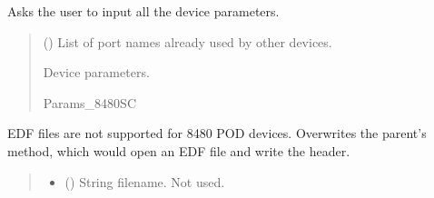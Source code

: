 \documentclass[letterpaper,10pt,english]{sphinxmanual}
\begin{document}
\begin{fulllineitems}
\begin{fulllineitems}
\label{\detokenize{Setup.SetupOneDevice:Setup.SetupOneDevice.Setup_8480SC.Setup8480SC._GetParam_onePODdevice}}
\pysigstartsignatures
{}
\pysigstopsignatures
\sphinxAtStartPar
Asks the user to input all the device parameters.
\begin{quote}\begin{description}
\sphinxAtStartPar
{} (\sphinxstyleliteralemphasis{\sphinxupquote{{[}}}\sphinxstyleliteralemphasis{\sphinxupquote{{]}}}) \textendash{} List of port names already used by other devices.

\sphinxAtStartPar
Device parameters.

\sphinxAtStartPar
Params\_8480SC

\end{description}\end{quote}

\end{fulllineitems}


\begin{fulllineitems}
\label{\detokenize{Setup.SetupOneDevice:Setup.SetupOneDevice.Setup_8480SC.Setup8480SC._OpenSaveFile_EDF}}
\pysigstartsignatures
{}
\pysigstopsignatures
\sphinxAtStartPar
EDF files are not supported for 8480 POD devices. Overwrites the         parent’s method, which would open an EDF file and write the header.
\begin{quote}\begin{description}
\begin{itemize}
\item {} 
\sphinxAtStartPar
{} () \textendash{} String filename. Not used.


\end{itemize}
\end{description}
\end{quote}
\end{fulllineitems}
\end{fulllineitems}
\end{document}
